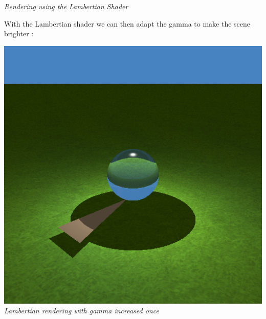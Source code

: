 \documentclass[a4,12pt]{article}
\begin{document}
\begin{center}
\begin{minipage}[b]{0.40\linewidth}
\begin{center}
				\textit{Rendering using the Lambertian Shader}
			\end{center}
		\end{minipage}
	\end{center}
	
	With the Lambertian shader we can then adapt the gamma to make the scene brighter :
	
	\begin{center}
		\begin{minipage}[b]{0.40\linewidth}
			\begin{center}
				\includegraphics[width = \textwidth]{./Worksheet3/TexturesRenderingShadowsGamma.png}\\
				\textit{Lambertian rendering with gamma increased once}
			\end{center}
		\end{minipage}
		\hspace{0.05\linewidth}
		\begin{minipage}[b]{0.40\linewidth}
			\begin{center}

\end{center}
\end{minipage}
\end{center}
\end{document}
